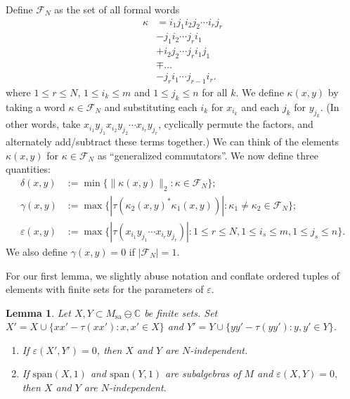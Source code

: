 \documentclass[10pt]{amsart}
\numberwithin{equation}{section}
\newtheorem{lem}[thm]{Lemma}
\theoremstyle{definition}
\newcommand{\C}{\mathbb{C}}
\newcommand{\cF}{\mathcal{F}}
\newcommand{\ee}{\varepsilon}
\begin{document}
Define $\cF_N$ as the set of all formal words 
\begin{align*}
    \kappa &={i_1}{j_1}{i_2}{j_2}\cdots {i_r}{j_r} \\
    & - {j_1}{i_2}\cdots {j_r}{i_1} \\
    &+ {i_2}{j_2}\cdots {j_r}{i_1}{j_1}\\
    &\mp \ldots \\
    &- {j_r}{i_1} \cdots {j_{r-1}}{i_r}.
\end{align*}
where $1\le r\le N$, $1\le i_k\le m$ and $1\le j_k \le n$ for all $k$. We define $\kappa(x,y)$ by taking a word $\kappa \in \cF_N$ and substituting each $i_k$ for $x_{i_k}$ and each $j_{k}$ for $y_{j_k}$. (In other words, take $x_{i_1}y_{j_1}x_{i_2}y_{j_2}\cdots x_{i_r}y_{j_r}$, cyclically permute the factors, and alternately add/subtract these terms together.) We can think of the elements $\kappa(x,y)$ for $\kappa \in \cF_N$ as ``generalized commutators''. We now define three quantities:
\begin{align*}
    \delta(x,y) &:= \min\{\|\kappa(x,y)\|_2 : \kappa \in \cF_N\}; \\
    \gamma(x,y) &:= \max\{|\tau(\kappa_2(x,y)^*\kappa_1(x,y))| : \kappa_1 \neq \kappa_2 \in \cF_N\};\\
    \ee(x,y) &:= \max\{|\tau(x_{i_1}y_{j_1}\cdots x_{i_r}y_{j_r})| : 1\le r\le N, 1\le i_s\le m, 1\le j_s\le n\}.
\end{align*}
We also define $\gamma(x,y) = 0$ if $|\mathcal{F}_N| = 1$.

For our first lemma, we slightly abuse notation and conflate ordered tuples of elements with finite sets for the parameters of $\ee.$

\begin{lem}\label{lem:trace-trick}
    Let $X,Y\subset M_{\mathrm{sa}}\ominus \C$ be finite sets. Set $X' = X\cup \{xx' - \tau(xx') : x,x'\in X\}$ and $Y' = Y \cup \{yy' - \tau(yy'): y,y'\in Y\}$. 
    \begin{enumerate}
        \item If $\ee(X',Y')=0$, then $X$ and $Y$ are $N$-independent.
        \item If $\mathrm{span}(X,1)$ and $\mathrm{span}(Y,1)$ are subalgebras of $M$ and $\ee(X,Y) = 0,$ then $X$ and $Y$ are $N$-independent.
    \end{enumerate}
\end{lem}
\end{document}
